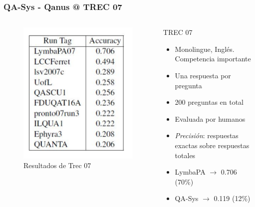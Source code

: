 \begin{frame}
\frametitle{QA-Sys - Qanus @ TREC 07}
\begin{columns}[T] %
\begin{column}{.48\textwidth}
  \begin{figure}
      \includegraphics[scale=0.5]{graficos/trec-7-accuracy-reduced}
    \caption{Resultados de Trec 07}
    \label{fig:tareas}
  \end{figure}
\end{column}%
\hfill%
\begin{column}{.48\textwidth}

  \begin{block}{TREC 07}
      \begin{itemize}
          \item Monolingue, Inglés. Competencia importante
          \item Una respuesta por pregunta
          \item 200 preguntas en total
          \item Evaluada por humanos
          \item \textit{Precisión}: respuestas exactas sobre respuestas totales
          \item LymbaPA $\rightarrow$ {\color{blue}0.706} (70\%)
          \item QA-Sys $\rightarrow$ {\color{blue}0.119} (12\%)
        \end{itemize}
  \end{block}
\end{column}%
\end{columns}

\end{frame}


